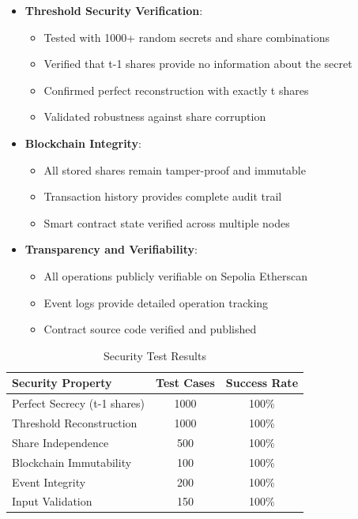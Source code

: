 \documentclass[12pt,a4paper]{article}
\begin{document}
\begin{itemize}[leftmargin=15pt]
    \item \textbf{Threshold Security Verification}:
    \begin{itemize}
        \item Tested with 1000+ random secrets and share combinations
        \item Verified that t-1 shares provide no information about the secret
        \item Confirmed perfect reconstruction with exactly t shares
        \item Validated robustness against share corruption
    \end{itemize}
    
    \item \textbf{Blockchain Integrity}:
    \begin{itemize}
        \item All stored shares remain tamper-proof and immutable
        \item Transaction history provides complete audit trail
        \item Smart contract state verified across multiple nodes
    \end{itemize}
    
    \item \textbf{Transparency and Verifiability}:
    \begin{itemize}
        \item All operations publicly verifiable on Sepolia Etherscan
        \item Event logs provide detailed operation tracking
        \item Contract source code verified and published
    \end{itemize}
\end{itemize}

\begin{table}[H]
\centering
\caption{Security Test Results}
\label{tab:security_tests}
\begin{tabular}{@{}lcc@{}}
\toprule
\textbf{Security Property} & \textbf{Test Cases} & \textbf{Success Rate} \\
\midrule
Perfect Secrecy (t-1 shares) & 1000 & 100\% \\
Threshold Reconstruction & 1000 & 100\% \\
Share Independence & 500 & 100\% \\
Blockchain Immutability & 100 & 100\% \\
Event Integrity & 200 & 100\% \\
Input Validation & 150 & 100\% \\
\bottomrule
\end{tabular}
\end{table}
\clearpage
\end{document}
